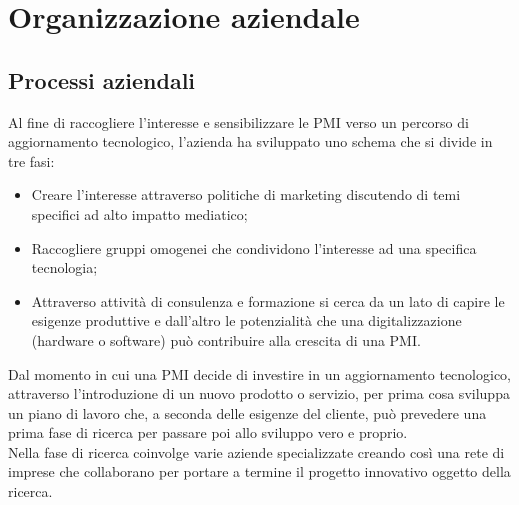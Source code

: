 \section{Organizzazione aziendale}





\subsection{Processi aziendali}
Al fine di raccogliere l'interesse e sensibilizzare le PMI verso un percorso di aggiornamento tecnologico, l'azienda ha sviluppato uno schema che si divide in tre fasi:
\begin{itemize}
\item Creare l’interesse attraverso politiche di marketing discutendo di temi specifici ad alto impatto mediatico;
\item Raccogliere gruppi omogenei che condividono l'interesse ad una specifica tecnologia;
\item Attraverso attività di consulenza e formazione si cerca da un lato di capire le esigenze produttive e dall’altro le potenzialità che una digitalizzazione (hardware o software) può contribuire alla crescita di una PMI.
\end{itemize}
Dal momento in cui una PMI decide di investire in un aggiornamento tecnologico, attraverso l'introduzione di un nuovo prodotto o servizio, \lab{} per prima cosa sviluppa un piano di lavoro che, a seconda delle esigenze del cliente, può prevedere una prima fase di ricerca per passare poi allo sviluppo vero e proprio.\\
Nella fase di ricerca \lab{} coinvolge varie aziende specializzate creando così una rete di imprese che collaborano per portare a termine il progetto innovativo oggetto della ricerca.

